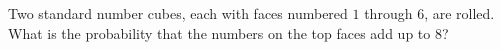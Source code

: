 Two standard number cubes, each with faces numbered $1$ through $6$, are rolled. What is the probability that the numbers on the top faces add up to $8$?
